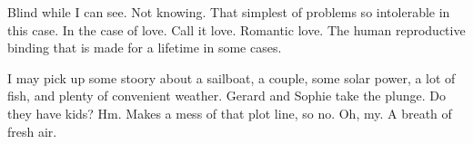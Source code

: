 

Blind while I can see.  Not knowing.  That simplest of problems so
intolerable in this case.  In the case of love.  Call it love.
Romantic love.  The human reproductive binding that is made for a
lifetime in some cases.

I may pick up some stoory about a sailboat, a couple, some solar
power, a lot of fish, and plenty of convenient weather.  Gerard and
Sophie take the plunge.  Do they have kids?  Hm.  Makes a mess of that
plot line, so no.  Oh, my.  A breath of fresh air.

\bye
